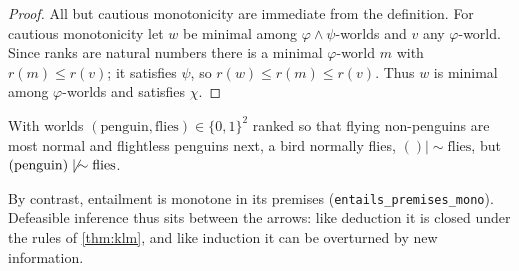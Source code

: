 \begin{proof}
All but cautious monotonicity are immediate from the definition. For cautious monotonicity let
$w$ be minimal among $\varphi\wedge\psi$-worlds and $v$ any $\varphi$-world. Since ranks are natural
numbers there is a minimal $\varphi$-world $m$ with $r(m)\le r(v)$; it satisfies $\psi$, so
$r(w)\le r(m)\le r(v)$. Thus $w$ is minimal among $\varphi$-worlds and satisfies $\chi$.
\end{proof}

\begin{proposition}\label{prop:tweety}
With worlds $(\mathrm{penguin},\mathrm{flies})\in\{0,1\}^2$ ranked so that flying non-penguins are
most normal and flightless penguins next, a bird normally flies, $()\mathrel{|\!\sim}\mathrm{flies}$,
but $(\mathrm{penguin})\not\mathrel{|\!\sim}\mathrm{flies}$.
\end{proposition}

By contrast, entailment is monotone in its premises (\texttt{entails\_premises\_mono}). Defeasible
inference thus sits between the arrows: like deduction it is closed under the rules of
\cref{thm:klm}, and like induction it can be overturned by new information.
